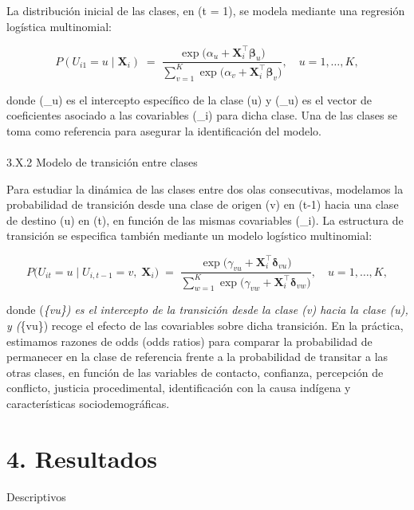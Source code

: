 \documentclass[
  letterpaper,
  DIV=11,
  numbers=noendperiod]{scrartcl}
\makeatletter
\let\oldparagraph\paragraph
\renewcommand{\paragraph}{
    \@ifstar
      \xxxParagraphStar
      \xxxParagraphNoStar
  }
\newcommand{\xxxParagraphStar}[1]{\oldparagraph*{#1}\mbox{}}
\newcommand{\xxxParagraphNoStar}[1]{\oldparagraph{#1}\mbox{}}
\makeatother
\begin{document}
La distribución inicial de las clases, en (t = 1), se modela mediante
una regresión logística multinomial:

\[
P(U_{i1} = u \mid \mathbf{X}_i) \;=\; 
\frac{\exp\big(\alpha_u + \mathbf{X}_i^\top \boldsymbol{\beta}_u\big)}
     {\displaystyle \sum_{v=1}^{K} \exp\big(\alpha_v + \mathbf{X}_i^\top \boldsymbol{\beta}_v\big)},
\quad u = 1,\dots,K,
\]

donde (\alpha\_u) es el intercepto específico de la clase (u) y
(\boldsymbol{\beta}\_u) es el vector de coeficientes asociado a las
covariables (\_i) para dicha clase. Una de las clases se toma
como referencia para asegurar la identificación del modelo.

\paragraph{3.X.2 Modelo de transición entre
clases}\label{x.2-modelo-de-transiciuxf3n-entre-clases}

Para estudiar la dinámica de las clases entre dos olas consecutivas,
modelamos la probabilidad de transición desde una clase de origen (v) en
(t-1) hacia una clase de destino (u) en (t), en función de las mismas
covariables (\_i). La estructura de transición se especifica
también mediante un modelo logístico multinomial:

\[
P\big(U_{it} = u \mid U_{i,t-1} = v,\; \mathbf{X}_i\big)
\;=\;
\frac{\exp\big(\gamma_{vu} + \mathbf{X}_i^\top \boldsymbol{\delta}_{vu}\big)}
     {\displaystyle \sum_{w=1}^{K} \exp\big(\gamma_{vw} + \mathbf{X}_i^\top \boldsymbol{\delta}_{vw}\big)},
\quad u = 1,\dots,K,
\]

donde (\gamma\emph{\{vu\}) es el intercepto de la transición desde la
clase (v) hacia la clase (u), y (\boldsymbol{\delta}}\{vu\}) recoge el
efecto de las covariables sobre dicha transición. En la práctica,
estimamos razones de odds (odds ratios) para comparar la probabilidad de
permanecer en la clase de referencia frente a la probabilidad de
transitar a las otras clases, en función de las variables de contacto,
confianza, percepción de conflicto, justicia procedimental,
identificación con la causa indígena y características
sociodemográficas.

\section{4. Resultados}\label{resultados}

Descriptivos
\end{document}
